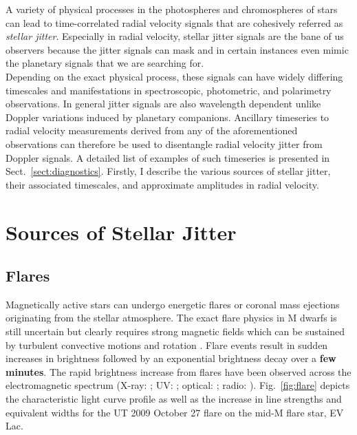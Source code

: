A variety of physical processes in the photospheres and chromospheres of stars 
can lead to time-correlated radial velocity signals that are cohesively 
referred as \emph{stellar jitter}. Especially in radial velocity, stellar jitter 
signals are the bane of us observers because the jitter signals can mask and 
in certain instances even mimic the planetary signals that we are searching for. \\

Depending on the exact physical process, these 
signals can have widely differing timescales and manifestations in 
spectroscopic, photometric, and polarimetry observations. In general jitter 
signals are also wavelength dependent unlike Doppler variations induced by 
planetary companions. Ancillary timeseries to radial velocity measurements 
derived from any of the aforementioned observations can therefore be used to 
disentangle radial velocity jitter from Doppler signals. A detailed list 
of examples of such timeseries is presented in Sect.~\ref{sect:diagnostics}. 
Firstly, I describe the various 
sources of stellar jitter, their associated timescales, and approximate 
amplitudes in radial velocity. 

\section{Sources of Stellar Jitter} \label{sect:jitter}
\subsection{Flares}
Magnetically active stars can undergo energetic flares or coronal mass 
ejections originating from the stellar atmosphere. The exact flare physics 
in M dwarfs is still uncertain but clearly requires strong magnetic fields 
which can be sustained by turbulent convective motions and rotation 
\parencite{browning08}. Flare events result in sudden increases in brightness 
followed by an exponential brightness decay over a \textbf{few minutes}. The rapid 
brightness increase from flares have been observed across the electromagnetic 
spectrum (X-ray: \cite{osten10}; UV: \cite{hawley07}; optical: 
\cite{kowalski09}; radio: \cite{osten08}). Fig.~\ref{fig:flare} depicts the 
characteristic light curve profile as well as the 
increase in line strengths and equivalent 
widths for the UT 2009 October 27 flare on the mid-M flare star, EV Lac. \\

